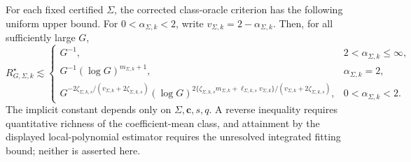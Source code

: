 For each fixed certified \(\Sigma\), the corrected class-oracle criterion has the following uniform upper bound. For \(0<\alpha_{\Sigma,k}<2\), write \(v_{\Sigma,k}=2-\alpha_{\Sigma,k}\). Then, for all sufficiently large \(G\), \[R_{G,\Sigma,k}^{\star}\lesssim\begin{cases}G^{-1},&2<\alpha_{\Sigma,k}\le\infty,\\G^{-1}(\log G)^{m_{\Sigma,k}+1},&\alpha_{\Sigma,k}=2,\\G^{-2\zeta_{\Sigma,k,s}/(v_{\Sigma,k}+2\zeta_{\Sigma,k,s})}(\log G)^{2\{\zeta_{\Sigma,k,s}m_{\Sigma,k}+\ell_{\Sigma,k,s}v_{\Sigma,k}\}/(v_{\Sigma,k}+2\zeta_{\Sigma,k,s})},&0<\alpha_{\Sigma,k}<2.\end{cases}\] The implicit constant depends only on \(\Sigma,\mathbf c,s,q\). A reverse inequality requires quantitative richness of the coefficient-mean class, and attainment by the displayed local-polynomial estimator requires the unresolved integrated fitting bound; neither is asserted here.